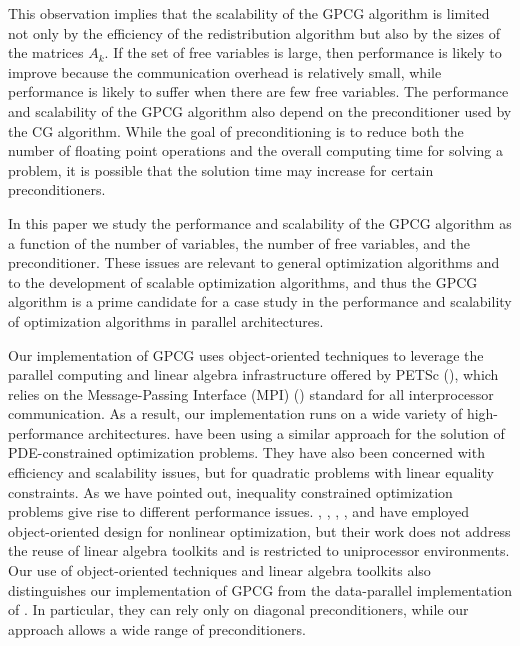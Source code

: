 \documentclass{esub2acm}
\begin{document}
This observation implies that the
scalability of the GPCG algorithm is limited not only by the efficiency
of the redistribution algorithm but also by the sizes of
the matrices $A_k$. If the set of free variables is large,
then performance is likely to improve because the
communication overhead is relatively small, while performance is
likely to suffer when there are few free variables.
The performance and scalability of the GPCG algorithm also depend
on the preconditioner used by the CG algorithm.
While the goal of preconditioning is to reduce both the number of
floating point operations and the overall computing time for solving
a problem, it is possible that the solution time may increase
for certain preconditioners.

In this paper we study the performance and scalability
of the GPCG algorithm as a function of the 
number of variables, the number of free variables, and the preconditioner.
These issues are relevant to general optimization algorithms and
to the development of scalable optimization algorithms, and thus
the GPCG algorithm is a prime candidate for a case study
in the performance and scalability of optimization algorithms
in parallel architectures.

Our implementation of GPCG uses object-oriented techniques
to leverage the parallel
computing and linear algebra infrastructure offered by PETSc
(), which relies on the Message-Passing 
Interface (MPI) () standard for all
interprocessor communication.  
As a result, our implementation runs on a wide variety of
high-performance architectures.
 have been using
a similar approach for the solution of PDE-constrained optimization problems.
They have also been concerned with efficiency and scalability
issues, but for quadratic problems with linear equality constraints.
As we have pointed out, inequality constrained optimization
problems give rise to different performance issues.
, 
,
, 
, and 
have employed object-oriented design
for nonlinear optimization, but their work
does not address the reuse of linear algebra toolkits and
is restricted to uniprocessor environments.
Our use of object-oriented techniques and linear algebra
toolkits also distinguishes our implementation of GPCG from
the data-parallel implementation of 
. In particular, they can rely only
on diagonal preconditioners, while our approach allows a wide
range of preconditioners.
\end{document}
